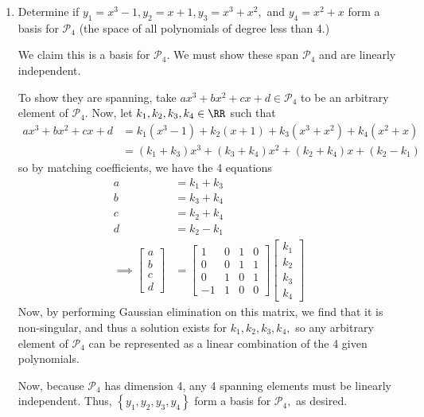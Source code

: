\documentclass{article}
\begin{document}
\begin{enumerate}
	\item Determine if $y_1=x^3-1, y_2=x+1, y_3=x^3+x^2,$ and $y_4=x^2+x$ form a basis for $\mathcal P_4$ (the space of all polynomials of degree less than 4.)
		\begin{soln}
			We claim this is a basis for $\mathcal P_4.$ We must show these span $\mathcal P_4$ and are linearly independent.

			To show they are spanning, take $ax^3+bx^2+cx+d\in\mathcal P_4$ to be an arbitrary element of $\mathcal P_4.$ Now, let $k_1, k_2, k_3, k_4\in\RR$ such that
			\begin{align*}
				ax^3+bx^2+cx+d &= k_1(x^3-1) + k_2(x+1) + k_3(x^3+x^2) + k_4(x^2+x) \\
				&= (k_1+k_3)x^3 + (k_3+k_4)x^2 + (k_2+k_4)x + (k_2-k_1)
			\end{align*}
			so by matching coefficients, we have the 4 equations
			\begin{align*}
				a &= k_1+k_3 \\
				b &= k_3+k_4 \\
				c &= k_2+k_4 \\
				d &= k_2-k_1 \\
				\implies \begin{bmatrix}
					a \\ b \\ c \\ d
				\end{bmatrix} &= \begin{bmatrix}
					1 & 0 & 1 & 0 \\
					0 & 0 & 1 & 1 \\
					0 & 1 & 0 & 1 \\
					-1 & 1 & 0 & 0
				\end{bmatrix}\begin{bmatrix}
					k_1 \\ k_2 \\ k_3 \\ k_4
				\end{bmatrix}
			\end{align*}
			Now, by performing Gaussian elimination on this matrix, we find that it is non-singular, and thus a solution exists for $k_1, k_2, k_3, k_4,$ so any arbitrary element of $\mathcal P_4$ can be represented as a linear combination of the 4 given polynomials.

			Now, because $\mathcal P_4$ has dimension 4, any 4 spanning elements must be linearly independent. Thus, $\left\{ y_1, y_2, y_3, y_4 \right\}$ form a basis for $\mathcal P_4,$ as desired.
		\end{soln}


\end{enumerate}
\end{document}
